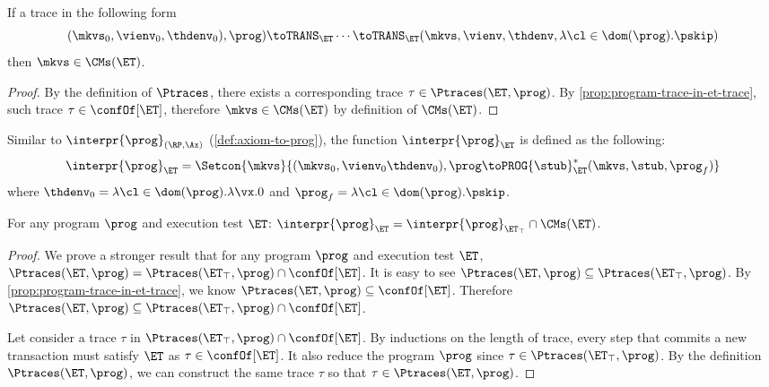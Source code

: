 \begin{corollary}
If a trace in the following form
\[
    (\mkvs_{0}, \vienv_{0}, \thdenv_{0}), \prog) \toTRANS_{\ET} \cdots \toTRANS_{\ET} 
    (\mkvs, \vienv, \thdenv, \lambda \cl \in \dom(\prog). \pskip)
\]
then $\mkvs \in \CMs(\ET)$.
\end{corollary}
\begin{proof}
    By the definition of \( \Ptraces \), 
    there exists a corresponding trace \( \tau \in \Ptraces(\ET, \prog) \).
    By \cref{prop:program-trace-in-et-trace}, such trace \( \tau \in \confOf[\ET] \),
    therefore \( \mkvs \in \CMs(\ET)\) by definition of \( \CMs(\ET) \).
\end{proof}

Similar to \( \interpr{\prog}_{(\RP,\Ax)} \) (\cref{def:axiom-to-prog}), the function \( \interpr{\prog}_{\ET} \) is defined as the following:
\[
    \interpr{\prog}_{\ET} = \Setcon{ \mkvs }{ (\mkvs_{0}, \vienv_0 \thdenv_{0} ), \prog \toPROG{\stub}_{\ET}^{\ast} (\mkvs, \stub, \prog_{f}) }
\]
where $\thdenv_{0} = \lambda \cl \in \dom(\prog).\lambda \vx.0$ and $\prog_{f} = \lambda \cl \in \dom(\prog).\pskip$.

\begin{proposition}
    \label{thm:consistency-intersect-permissive}
    For any program $\prog$ and execution test $\ET$:
    \( \interpr{\prog}_{\ET} = \interpr{\prog}_{\ET_\top}  \cap \CMs(\ET) \).
\end{proposition}
\begin{proof}
    We prove a stronger result that for any program $\prog$ and execution test $\ET$, $\Ptraces(\ET, \prog) = \Ptraces(\ET_{\top}, \prog) \cap \confOf[\ET]$.
    It is easy to see \(\Ptraces(\ET, \prog) \subseteq \Ptraces(\ET_\top, \prog) \).
    By \cref{prop:program-trace-in-et-trace}, we know \( \Ptraces(\ET, \prog) \subseteq \confOf[\ET]\).
    Therefore \(  \Ptraces(\ET, \prog) \subseteq \Ptraces(\ET_\top, \prog) \cap \confOf[\ET] \).

    Let consider a trace \( \tau \) in \( \Ptraces(\ET_\top, \prog) \cap \confOf[\ET] \).
    By inductions on the length of trace, 
    every step that commits a new transaction  must satisfy \( \ET \) as \( \tau \in \confOf[\ET] \).
    It also reduce the program \( \prog \) since \( \tau \in \Ptraces(\ET_\top, \prog) \).
    By the definition \( \Ptraces(\ET, \prog) \), we can construct the same trace \( \tau \) so that \( \tau \in \Ptraces(\ET, \prog) \).
\end{proof}
